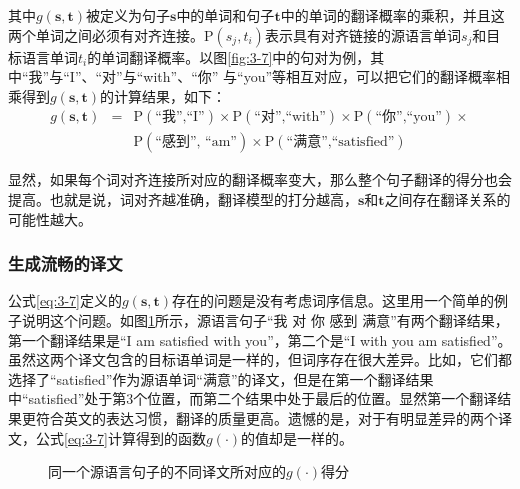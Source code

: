 \noindent 其中$g(\mathbf{s},\mathbf{t})$被定义为句子$\mathbf{s}$中的单词和句子$\mathbf{t}$中的单词的翻译概率的乘积，并且这两个单词之间必须有对齐连接。$\textrm{P}(s_j,t_i)$表示具有对齐链接的源语言单词$s_j$和目标语言单词$t_i$的单词翻译概率。以图\ref{fig:3-7}中的句对为例，其中``我''与``I''、``对''与``with''、``你'' 与``you''等相互对应，可以把它们的翻译概率相乘得到$g(\mathbf{s},\mathbf{t})$的计算结果，如下：
\begin{eqnarray}
{g(\mathbf{s},\mathbf{t})}&= &  \textrm{P}(\textrm{``我'',``I''}) \times \textrm{P}(\textrm{``对'',``with''}) \times \textrm{P}(\textrm{``你'',``you''}) \times \nonumber \\
          &    & \textrm{P}(\textrm{``感到'', ``am''}) \times \textrm{P}(\textrm{``满意'',``satisfied''})
\label{eq:3-8}
\end{eqnarray}

\parinterval  显然，如果每个词对齐连接所对应的翻译概率变大，那么整个句子翻译的得分也会提高。也就是说，词对齐越准确，翻译模型的打分越高，$\mathbf{s}$和$\mathbf{t}$之间存在翻译关系的可能性越大。


\subsubsection{生成流畅的译文}

\parinterval 公式\ref{eq:3-7}定义的$g(\mathbf{s},\mathbf{t})$存在的问题是没有考虑词序信息。这里用一个简单的例子说明这个问题。如图\ref{fig:3-8}所示，源语言句子``我 对 你 感到 满意''有两个翻译结果，第一个翻译结果是``I am satisfied with you''，第二个是``I with you am satisfied''。虽然这两个译文包含的目标语单词是一样的，但词序存在很大差异。比如，它们都选择了``satisfied''作为源语单词``满意''的译文，但是在第一个翻译结果中``satisfied''处于第3个位置，而第二个结果中处于最后的位置。显然第一个翻译结果更符合英文的表达习惯，翻译的质量更高。遗憾的是，对于有明显差异的两个译文，公式\ref{eq:3-7}计算得到的函数$g(\cdot)$的值却是一样的。

\begin{figure}[htp]
    \centering

    \caption{同一个源语言句子的不同译文所对应的$g(\cdot)$得分}
    \label{fig:3-8}
\end{figure}

